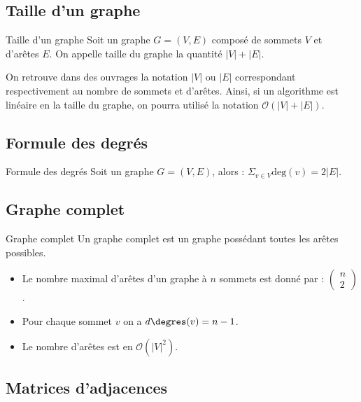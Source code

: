 \subsection{Taille d'un graphe}

\begin{defi}{Taille d'un graphe}
Soit un graphe $G=\left(V,E\right)$ composé de sommets $V$ et d'arêtes $E$. On appelle taille du graphe la quantité $|V|+|E|$.
\end{defi}

\begin{rem}
On retrouve dans des ouvrages la notation $|V|$ ou $|E|$ correspondant respectivement au nombre de sommets et d'arêtes. 
Ainsi, si un algorithme est linéaire en la taille du graphe, on pourra utilisé la notation $\mathcal{O}\left(|V|+|E|\right)$.
\end{rem}

\subsection{Formule des degrés}
\begin{defi}{Formule des degrés}
Soit un graphe $G=\left(V,E\right)$, alors : $\displaystyle{\Sigma_{v \in V}} \text{deg}(v) = 2|E|$.
\end{defi}

\subsection{Graphe complet}

\begin{defi}{Graphe complet}
Un graphe complet est un graphe possédant toutes les arêtes possibles. 
\end{defi}

\begin{rem}
\begin{itemize}
\item Le nombre maximal d'arêtes d'un graphe à $n$ sommets est donné par : $\begin{pmatrix} n \\ 2\end{pmatrix}$.
\item Pour chaque sommet $v$ on a $d\degres (v) = n-1$.
\item Le nombre d'arêtes est en $\mathcal{O}\left(|V|^2\right)$.
\end{itemize}
\end{rem}

\subsection{Matrices d'adjacences}

